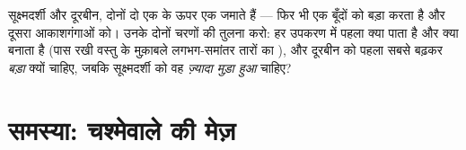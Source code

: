 \begin{exercise}[$\star\star\star$]\label{exo:g8:lenses-images:12}
सूक्ष्मदर्शी और दूरबीन, दोनों दो  एक के ऊपर एक जमाते हैं
--- फिर भी एक बूँदों को बड़ा करता है और दूसरा आकाशगंगाओं को। उनके दोनों
चरणों की तुलना करो: हर उपकरण में पहला  क्या पाता है और क्या बनाता
है (पास रखी वस्तु के मुक़ाबले लगभग-समांतर तारों का ), और दूरबीन
को पहला  सबसे बढ़कर \emph{बड़ा} क्यों चाहिए, जबकि सूक्ष्मदर्शी को
वह \emph{ज़्यादा मुड़ा हुआ} चाहिए?
\end{exercise}

\section{समस्या: चश्मेवाले की मेज़}

